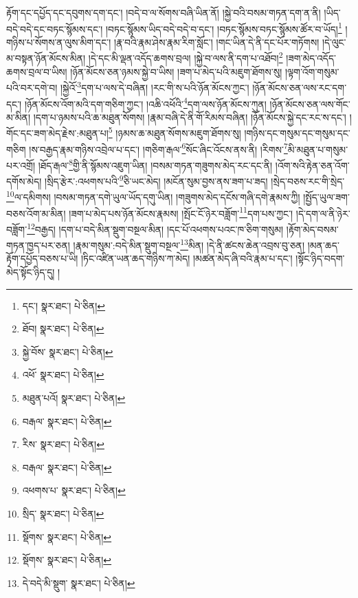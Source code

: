 རྟོག་དང་དཔྱོད་དང་དབུགས་དག་དང་། །བདེ་བ་ལ་སོགས་བཞི་ཡིན་ནོ། །སྐྱེ་བའི་བསམ་གཏན་དག་ན་ནི། །ཡིད་བདེ་བདེ་དང་བཏང་སྙོམས་དང་། །བཏང་སྙོམས་ཡིད་བདེ་བདེ་བ་དང་། །བཏང་སྙོམས་བཏང་སྙོམས་ཚོར་བ་ཡོད།\footnote{དང་།  སྣར་ཐང་།  པེ་ཅིན། } །གཉིས་པ་སོགས་ན་ལུས་མིག་དང་། །རྣ་བའི་རྣམ་ཤེས་རྣམ་རིག་སློང་། །གང་ཡིན་དེ་ནི་དང་པོར་གཏོགས། །དེ་ལུང་མ་བསྟན་ཉོན་མོངས་མིན། །དེ་དང་མི་ལྡན་འདོད་ཆགས་བྲལ། །སྐྱེ་བ་ལས་ནི་དག་པ་འཐོབ།\footnote{ཐོབ།  སྣར་ཐང་།  པེ་ཅིན། } །ཟག་མེད་འདོད་ཆགས་བྲལ་བ་ཡིས། །ཉོན་མོངས་ཅན་ཉམས་སྐྱེ་བ་ཡིས། །ཟག་པ་མེད་པའི་མཇུག་ཐོགས་སུ། །ལྟག་འོག་གསུམ་པའི་བར་དགེ་བ། །སྐྱེའོ་\footnote{སྐྱེ་བོས་  སྣར་ཐང་།  པེ་ཅིན། }དག་པ་ལས་དེ་བཞིན། །རང་གི་ས་པའི་ཉོན་མོངས་ཀྱང་། །ཉོན་མོངས་ཅན་ལས་རང་དག་དང་། །ཉོན་མོངས་འོག་མའི་དག་གཅིག་ཀྱང་། །འཆི་འཕོའི་\footnote{འཕོ་  སྣར་ཐང་།  པེ་ཅིན། }དག་ལས་ཉོན་མོངས་ཀུན། །ཉོན་མོངས་ཅན་ལས་གོང་མ་མིན། །དག་པ་ཉམས་པའི་ཆ་མཐུན་སོགས། །རྣམ་བཞི་དེ་ནི་གོ་རིམས་བཞིན། །ཉོན་མོངས་སྐྱེ་དང་རང་ས་དང་། །གོང་དང་ཟག་མེད་རྗེས་:མཐུན་པ།\footnote{མཐུན་པའོ།  སྣར་ཐང་།  པེ་ཅིན། } །ཉམས་ཆ་མཐུན་སོགས་མཇུག་ཐོགས་སུ། །གཉིས་དང་གསུམ་དང་གསུམ་དང་གཅིག །ས་བརྒྱད་རྣམ་གཉིས་འབྲེལ་པ་དང་། །གཅིག་རྒལ་\footnote{བརྒལ་  སྣར་ཐང་།  པེ་ཅིན། }སོང་ཞིང་འོངས་ནས་ནི། །རིགས་\footnote{རིས་  སྣར་ཐང་།  པེ་ཅིན། }མི་མཐུན་པ་གསུམ་པར་འགྲོ། །ཐོད་རྒལ་\footnote{བརྒལ་  སྣར་ཐང་།  པེ་ཅིན། }གྱི་ནི་སྙོམས་འཇུག་ཡིན། །བསམ་གཏན་གཟུགས་མེད་རང་དང་ནི། །འོག་སའི་རྟེན་ཅན་འོག་དགོས་མེད། །སྲིད་རྩེར་:འཕགས་པའི་\footnote{འཕགས་པ་  སྣར་ཐང་།  པེ་ཅིན། }ཅི་ཡང་མེད། །མངོན་སུམ་བྱས་ནས་ཟག་པ་ཟད། །སྲེད་བཅས་རང་གི་སྲེད་\footnote{སྲིད་  སྣར་ཐང་།  པེ་ཅིན། }ལ་དམིགས། །བསམ་གཏན་དགེ་ཡུལ་ཡོད་དགུ་ཡིན། །གཟུགས་མེད་དངོས་གཞི་དགེ་རྣམས་ཀྱི། །སྤྱོད་ཡུལ་ཟག་བཅས་འོག་མ་མིན། །ཟག་པ་མེད་པས་ཉོན་མོངས་རྣམས། །སྤོང་ངོ་ཉེར་བཟློག་\footnote{སྡོགས་  སྣར་ཐང་།  པེ་ཅིན། }དག་པས་ཀྱང་། །དེ་དག་ལ་ནི་ཉེར་བཟློག་\footnote{སྡོགས་  སྣར་ཐང་།  པེ་ཅིན། }བརྒྱད། །དག་པ་བདེ་མིན་སྡུག་བསྔལ་མིན། །དང་པོ་འཕགས་པའང་ཁ་ཅིག་གསུམ། །རྟོག་མེད་བསམ་གཏན་ཁྱད་པར་ཅན། །རྣམ་གསུམ་:བདེ་མིན་སྡུག་བསྔལ་\footnote{དེ་བདེ་མི་སྡུག་  སྣར་ཐང་།  པེ་ཅིན། }མིན། །དེ་ནི་ཚངས་ཆེན་འབྲས་བུ་ཅན། །མན་ཆད་རྟོག་དཔྱོད་བཅས་པ་ཡི། །ཏིང་འཛིན་ཡན་ཆད་གཉིས་ཀ་མེད། །མཚན་མེད་ཞི་བའི་རྣམ་པ་དང་། །སྟོང་ཉིད་བདག་མེད་སྟོང་ཉིད་དུ། །
